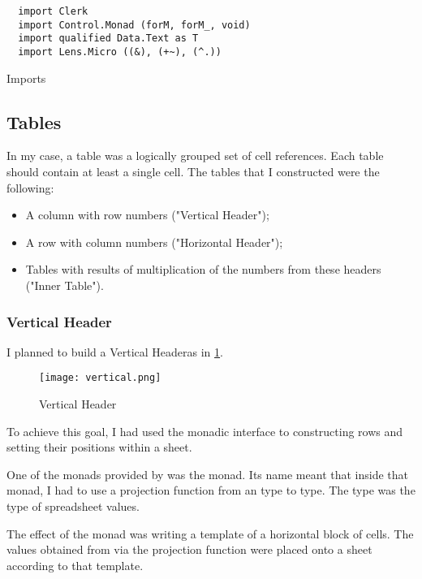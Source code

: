 \begin{listing}[!h]
  \begin{verbatim}
  import Clerk
  import Control.Monad (forM, forM_, void)
  import qualified Data.Text as T
  import Lens.Micro ((&), (+~), (^.))
\end{verbatim}
  \caption{Imports}
  \label{example2:imports}
\end{listing}

\subsection{Tables}

\newcommand{\vh}{Vertical Header}
\newcommand{\hh}{Horizontal Header}

In my case, a table was a logically grouped set of cell references.
Each table should contain at least a single cell.
The tables that I constructed were the following:

\begin{itemize}
  \item A column with row numbers ("\vh");
  \item A row with column numbers ("\hh");
  \item Tables with results of multiplication of the numbers from these headers ("Inner Table").
\end{itemize}

\subsubsection{\vh}
\label{example2:verticalHeaderSection}

I planned to build a \vh as in \cref{example2:verticalHeader}.

\begin{figure}[h]
  \centering
  \texttt{[image: vertical.png]}
  \caption{\vh}
  \label{example2:verticalHeader}
\end{figure}

To achieve this goal, I had used the \clerk monadic interface to constructing rows and setting their positions within a sheet.

One of the monads provided by \clerk was the  monad. Its name meant that inside that monad, I had to use a projection function from an  type to  type. The  type was the type of spreadsheet values.

The effect of the  monad was writing a template of a horizontal block of cells. The values obtained from  via the projection function were placed onto a sheet according to that template.

